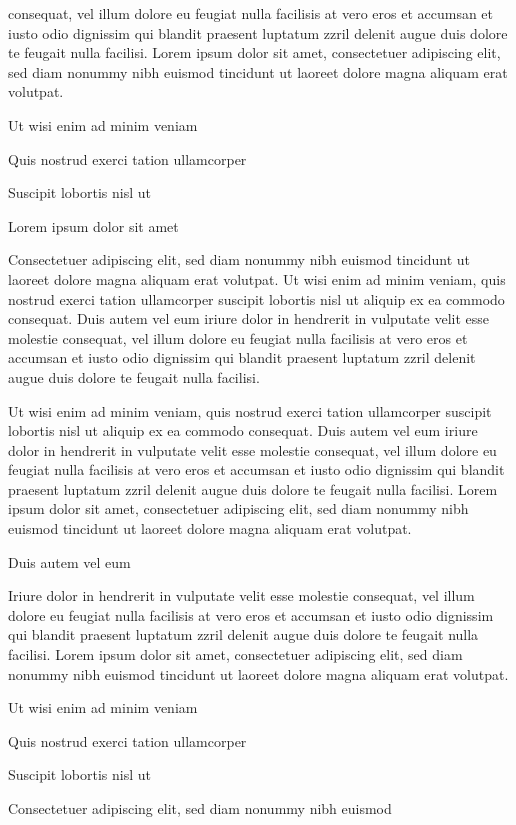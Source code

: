 \documentclass[11pt,twoside]{article}\makeatletter
\begin{document}
      consequat, vel illum dolore eu feugiat nulla facilisis at vero eros et
      accumsan et iusto odio dignissim qui blandit praesent luptatum zzril
      delenit augue duis dolore te feugait nulla facilisi. Lorem ipsum dolor
      sit amet, consectetuer adipiscing elit, sed diam nonummy nibh euismod
      tincidunt ut laoreet dolore magna aliquam erat volutpat. \par Ut wisi enim ad minim veniam\par Quis nostrud exerci tation ullamcorper \par Suscipit lobortis nisl ut \par Lorem ipsum dolor sit amet\par Consectetuer adipiscing elit, sed diam nonummy nibh euismod
      tincidunt ut laoreet dolore magna aliquam erat volutpat. Ut wisi enim
      ad minim veniam, quis nostrud exerci tation ullamcorper suscipit
      lobortis nisl ut aliquip ex ea commodo consequat. Duis autem vel eum
      iriure dolor in hendrerit in vulputate velit esse molestie consequat,
      vel illum dolore eu feugiat nulla facilisis at vero eros et accumsan
      et iusto odio dignissim qui blandit praesent luptatum zzril delenit
      augue duis dolore te feugait nulla facilisi.\par Ut wisi enim ad minim veniam, quis nostrud exerci tation
      ullamcorper suscipit lobortis nisl ut aliquip ex ea commodo
      consequat. Duis autem vel eum iriure dolor in hendrerit in vulputate
      velit esse molestie consequat, vel illum dolore eu feugiat nulla
      facilisis at vero eros et accumsan et iusto odio dignissim qui blandit
      praesent luptatum zzril delenit augue duis dolore te feugait nulla
      facilisi. Lorem ipsum dolor sit amet, consectetuer adipiscing elit,
      sed diam nonummy nibh euismod tincidunt ut laoreet dolore magna
      aliquam erat volutpat. \par Duis autem vel eum \par Iriure dolor in hendrerit in vulputate velit esse molestie
      consequat, vel illum dolore eu feugiat nulla facilisis at vero eros et
      accumsan et iusto odio dignissim qui blandit praesent luptatum zzril
      delenit augue duis dolore te feugait nulla facilisi. Lorem ipsum dolor
      sit amet, consectetuer adipiscing elit, sed diam nonummy nibh euismod
      tincidunt ut laoreet dolore magna aliquam erat volutpat. \par Ut wisi enim ad minim veniam\par Quis nostrud exerci tation ullamcorper \par Suscipit lobortis nisl ut \par Consectetuer adipiscing elit, sed diam nonummy nibh euismod
\end{document}
